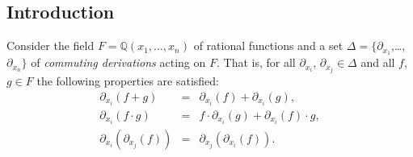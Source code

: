
\newenvironment{reduce}{\begin{scriptsize}\begin{verbatim}}%
{\end{verbatim}\end{scriptsize}}

\newenvironment{ebnf}{\begin{tabular}{rcll}}{\end{tabular}}
\newcommand{\ebnfvar}[1]{{\textit{#1}}\ \ }
\newcommand{\ebnfvara}[1]{$\left\langle \text{\textit{#1}}\right\rangle$\ \ }
\newcommand{\ebnfor}{\textrm{\ $|$\ \ }}
\newcommand{\ebnfterm}[1]{\textrm{\textbf{\texttt{#1}}}\ \ }
\newcommand{\ebnfoption}[1]{\textrm{$\left[\;\text{#1}\;\right]$}\ \ }
\newcommand{\ebnfmult}[1]{\textrm{$\left\{\;\text{#1}\;\right\}$}\ \ }
\newcommand{\ebnfattrib}[1]{{$\bigl\{$\ {#1}\ $\bigr\}$}\ \ }

\newcommand{\ebnfrule}[2]{{#1}&$\ \ \rightarrow\ \ $&{#2}&\\}
\newcommand{\ebnfrulev}[2]{{\ebnfvar{#1}}&$\ \ \rightarrow\ \ $&{#2}&\\}
\newcommand{\ebnfhalfrule}[1]{&&{\ebnfor {#1}}&\\}
\newcommand{\ebnfrulea}[3]{{#1}&$\ \ \rightarrow\ \ $&{#2}&{$\bigl\{$\ {#3}\ $\bigr\}$}\\}
\newcommand{\ebnfruleav}[3]{{\ebnfvar{#1}}&$\ \ \rightarrow\ \ $&{#2}&{$\bigl\{$\ {#3}\ $\bigr\}$}\\}
\newcommand{\ebnfhalfrulea}[2]{&&{\ebnfor {#1}}&{$\bigl\{$\ {#2}\ $\bigr\}$}\\}

\newcommand{\ebnfsinglerulev}[2]{\textrm{{\ebnfvar{#1}}$\ \ \rightarrow\ \ ${#2}\\}}
\newcommand{\ebnfsinglerule}[2]{\textrm{{#1}$\ \ \rightarrow\ \ ${#2}\\}}
\newcommand{\ebnfsingleruleav}[3]{\textrm{{\ebnfvar{#1}}$\ \ \rightarrow\ \ ${#2}\ \ \ $\bigl\{$\ {#3}\ $\bigr\}$\\}}
\newcommand{\ebnfsinglerulea}[3]{\textrm{{#1}$\ \ \rightarrow\ \ ${#2}\ \
    \ $\bigl\{$\ {#3}\ $\bigr\}$\\}}


\subsection{Introduction}
Consider the field $F = \mathbb{Q}(x_1,\dots,x_n)$ of rational functions and a
set $\Delta = \{\partial_{x_1}$,\dots,~$\partial_{x_n}\}$ of
\emph{commuting derivations} acting on $F$. That is, for all
$\partial_{x_i}$, $\partial_{x_j} \in \Delta$ and all $f$, $g\in F$
the following properties are satisfied:
\begin{eqnarray}
\partial_{x_i}(f + g) &=& \partial_{x_i}(f) + \partial_{x_i}(g),\nonumber\\
\partial_{x_i}(f\cdot g) &=& f\cdot\partial_{x_i}(g)
  + \partial_{x_i}(f)\cdot g,\label{EQ:leibnitz}\\
\partial_{x_i}(\partial_{x_j}(f)) &=& \partial_{x_j}(\partial_{x_i}(f)).\label{EQ:comm}
\end{eqnarray}

